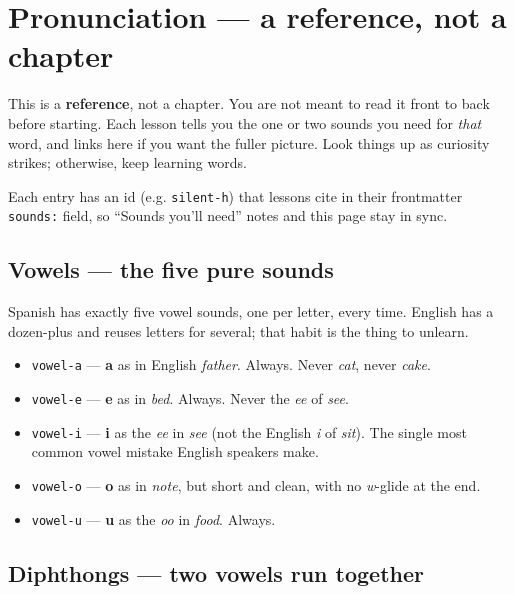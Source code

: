 
\chapter*{Pronunciation --- a reference, not a chapter}

This is a \textbf{reference}, not a chapter. You are not meant to read it front to back before starting. Each lesson tells you the one or two sounds you need for \emph{that} word, and links here if you want the fuller picture. Look things up as curiosity strikes; otherwise, keep learning words.

Each entry has an id (e.g. \texttt{silent-h}) that lessons cite in their frontmatter \texttt{sounds:} field, so \textquotedblleft{}Sounds you'll need\textquotedblright{} notes and this page stay in sync.

\section*{Vowels — the five pure sounds}

Spanish has exactly five vowel sounds, one per letter, every time. English has a dozen-plus and reuses letters for several; that habit is the thing to unlearn.

\begin{itemize}
\raggedright
\setlength{\itemsep}{0.35em}
  \item \texttt{vowel-a} — \textbf{a} as in English \emph{father}. Always. Never \emph{cat}, never \emph{cake}.
  \item \texttt{vowel-e} — \textbf{e} as in \emph{bed}. Always. Never the \emph{ee} of \emph{see}.
  \item \texttt{vowel-i} — \textbf{i} as the \emph{ee} in \emph{see} (not the English \emph{i} of \emph{sit}). The single most common vowel mistake English speakers make.
  \item \texttt{vowel-o} — \textbf{o} as in \emph{note}, but short and clean, with no \emph{w}-glide at the end.
  \item \texttt{vowel-u} — \textbf{u} as the \emph{oo} in \emph{food}. Always.
\end{itemize}

\section*{Diphthongs — two vowels run together}

